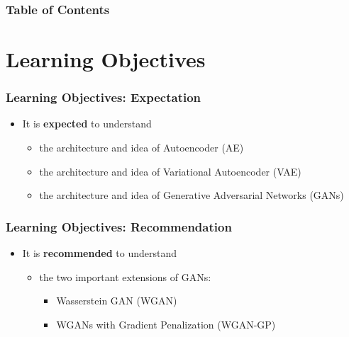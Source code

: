 \documentclass{beamer}
\begin{document}
\begin{frame}
\setlength{\leftmargini}{0.3cm}
\setlength{\leftmarginii}{0.6cm}
\setlength{\leftmarginiii}{0.9cm}
\frametitle{Table of Contents} %
\begin{multicols}{2}
\tableofcontents %
\end{multicols}
\end{frame}


\section{Learning Objectives}
\begin{frame}
\setlength{\leftmargini}{0.3cm}
\setlength{\leftmarginii}{0.6cm}
\setlength{\leftmarginiii}{0.9cm}
\frametitle{Learning Objectives: Expectation}
\begin{itemize}
\item It is \textbf{expected} to understand
	\begin{itemize}
	\item the architecture and idea of Autoencoder (AE)
	\item the architecture and idea of Variational Autoencoder (VAE)
	\item the architecture and idea of Generative Adversarial Networks (GANs)
	\end{itemize}
\end{itemize}
\end{frame}

\begin{frame}
\setlength{\leftmargini}{0.3cm}
\setlength{\leftmarginii}{0.6cm}
\setlength{\leftmarginiii}{0.9cm}
\frametitle{Learning Objectives: Recommendation}
\begin{itemize}
\item It is \textbf{recommended} to understand
	\begin{itemize}	
	\item the two important extensions of GANs:
		\begin{itemize}
		\item Wasserstein GAN (WGAN)
		\item WGANs with Gradient Penalization (WGAN-GP)
		\end{itemize} 
	\end{itemize}
\end{itemize}
\end{frame}
\end{document}
